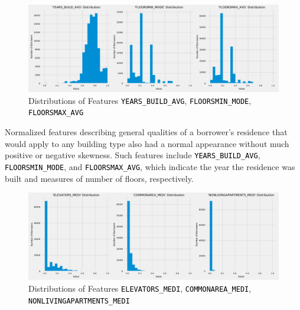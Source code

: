 \documentclass[12pt, letterpaper]{article}
\begin{document}
\begin{figure}[ht]
\includegraphics[width=\textwidth]{distribsYEARSBUILDAVGFLOORSMINMODEFLOORSMAXAVG}
\centering
\caption{Distributions of Features \colorbox{backcolor}{\textcolor{black}{\texttt{YEARS_BUILD_AVG}}}, \colorbox{backcolor}{\textcolor{black}{\texttt{FLOORSMIN_MODE}}}, \colorbox{backcolor}{\textcolor{black}{\texttt{FLOORSMAX_AVG}}}}
\end{figure}

Normalized features describing general qualities of a borrower's residence that would apply to any building type also had a normal appearance without much positive or negative skewness. Such features include \colorbox{backcolor}{\textcolor{black}{\texttt{YEARS_BUILD_AVG}}}, \colorbox{backcolor}{\textcolor{black}{\texttt{FLOORSMIN_MODE}}}, and \colorbox{backcolor}{\textcolor{black}{\texttt{FLOORSMAX_AVG}}}, which indicate the year the residence was built and measures of number of floors, respectively.

\begin{figure}[ht]
\includegraphics[width=\textwidth]{distribsELEVATORSMEDICOMMONAREAMEDINONLIVINGAPARTMENTSMED}
\centering
\caption{Distributions of Features \colorbox{backcolor}{\textcolor{black}{\texttt{ELEVATORS_MEDI}}}, \colorbox{backcolor}{\textcolor{black}{\texttt{COMMONAREA_MEDI}}}, \colorbox{backcolor}{\textcolor{black}{\texttt{NONLIVINGAPARTMENTS_MEDI}}}}
\end{figure}
\end{document}
